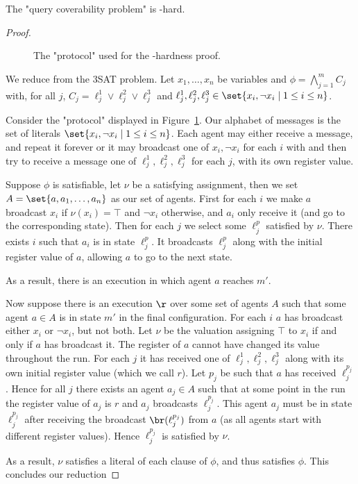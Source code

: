 \begin{proposition}
	The "query coverability problem" is \np-hard.
\end{proposition}

\begin{proof}
	\begin{figure}[h]
		
		\label{fig:np-hard}
		\caption{The "protocol" used for the \np-hardness proof.}
	\end{figure}
	
	We reduce from the 3SAT problem.
	Let $x_1, \ldots, x_n$ be variables and $\phi = \bigwedge_{j=1}^m C_j$ with, for all $j$, $C_j = \ell_j^1 \lor \ell_j^2 \lor \ell_j^3$ and $\ell_j^1, \ell_j^2, \ell_j^3 \in \set{x_i, \neg x_i \mid 1 \leq i \leq n}$. 

	Consider the "protocol" displayed in Figure~\ref{fig:np-hard}.
	Our alphabet of messages is the set of literals $\set{x_i, \neg x_i \mid 1 \leq i \leq n}$.
	Each agent may either receive a message, and repeat it forever or it may broadcast one of $x_i, \neg x_i$ for each $i$ with and then try to receive a message one of $\ell_j^1, \ell_j^2, \ell_j^3$ for each $j$, with its own register value.
	
	Suppose $\phi$ is satisfiable, let $\nu$ be a satisfying assignment, then we set $A = \set{a, a_1, \ldots, a_n}$ as our set of agents. First for each $i$ we make $a$ broadcast $x_i$ if $\nu(x_i)= \top$ and $\neg x_i$ otherwise, and $a_i$ only receive it (and go to the corresponding state).
	Then for each $j$ we select some $\ell_j^p$ satisfied by $\nu$. There exists $i$ such that $a_i$ is in state $\ell_j^p$. It broadcasts $\ell_j^p$ along with the initial register value of $a$, allowing $a$ to go to the next state.
	
	As a result, there is an execution in which agent $a$ reaches $m'$.
	
	Now suppose there is an execution $\r$ over some set of agents $A$ such that some agent $a \in A$ is in state $m'$ in the final configuration.
	For each $i$ $a$ has broadcast either $x_i$ or $\neg x_i$, but not both.
	Let $\nu$ be the valuation assigning $\top$ to $x_i$ if and only if $a$ has broadcast it.
	The register of $a$ cannot have changed its value throughout the run. 
	For each $j$ it has received one of $\ell_j^1, \ell_j^2, \ell_j^3$ along with its own initial register value (which we call $r$). Let $p_j$ be such that $a$ has received $\ell_j^{p_j}$.
	Hence for all $j$ there exists an agent $a_j \in A$ such that at some point in the run the register value of $a_j$ is $r$ and $a_j$ broadcasts $\ell_j^{p_j}$.
	This agent $a_j$ must be in state $\ell_j^{p_j}$ after receiving the broadcast $\br(\ell_j^{p_j})$ from $a$ (as all agents start with different register values).
	Hence $\ell_j^{p_j}$ is satisfied by $\nu$. 
	
	As a result, $\nu$ satisfies a literal of each clause of $\phi$, and thus satisfies $\phi$. This concludes our reduction
\end{proof}
